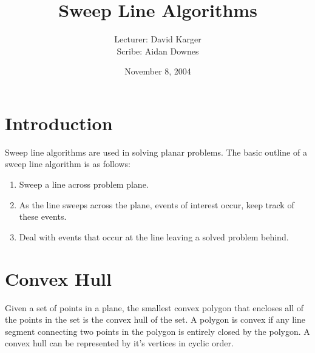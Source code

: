 \documentclass{article}
\title{Sweep Line Algorithms}
\date{November 8, 2004}
\author{Lecturer: David Karger\\ Scribe: Aidan Downes}
\begin{document}
%
%
%
%

%



\section{Introduction}

Sweep line algorithms are used in solving planar problems. The basic outline of a sweep line algorithm is as follows:
\begin{enumerate}
\item Sweep a line across problem plane. 
\item As the line sweeps across the plane, events of interest occur, keep track of these events.
\item Deal with events that occur at the line leaving a solved problem behind.
\end{enumerate}


\section{Convex Hull}

Given a set of points in a plane, the smallest convex polygon that encloses all of the points in the set is the convex hull of the set. A polygon is convex if any line segment connecting two points in the polygon is entirely closed by the polygon. A convex hull can be represented by it's vertices in cyclic order.
\end{document}
